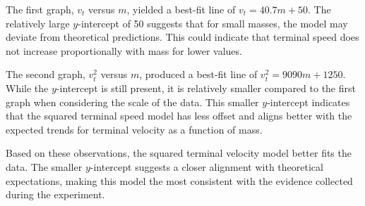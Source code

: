 \documentclass[12pt, letterpaper]{article}
\begin{document}
The first graph, $v_t$ versus $m$, yielded a best-fit line of $v_t = 40.7m + 50$. The relatively large $y$-intercept of 50 suggests that for small masses, the model may deviate from theoretical predictions. This could indicate that terminal speed does not increase proportionally with mass for lower values.

The second graph, $v_t^2$ versus $m$, produced a best-fit line of $v_t^2 = 9090m + 1250$. While the $y$-intercept is still present, it is relatively smaller compared to the first graph when considering the scale of the data. This smaller $y$-intercept indicates that the squared terminal speed model has less offset and aligns better with the expected trends for terminal velocity as a function of mass.

Based on these observations, the squared terminal velocity model better fits the data. The smaller $y$-intercept suggests a closer alignment with theoretical expectations, making this model the most consistent with the evidence collected during the experiment.
\end{document}
